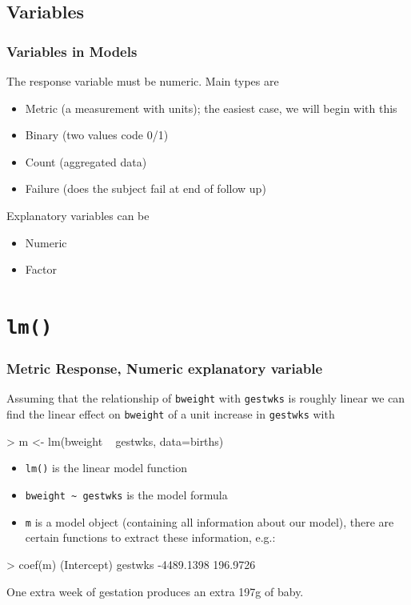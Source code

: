 \documentclass[xcolor={table}]{beamer}
\begin{document}
\subsection{Variables}
\begin{frame}\frametitle{Variables in Models}
The response variable must be numeric. Main types are
\begin{itemize}
\item Metric (a measurement with units); the easiest case, we will begin with this
\item Binary (two values code 0/1) 
\item Count (aggregated data)
\item Failure (does the subject fail at end of follow up)
\end{itemize}
Explanatory variables can be
\begin{itemize}
\item Numeric
\item Factor
\end{itemize}
\end{frame}




\section{\texttt{lm()}}
\begin{frame}[fragile]\frametitle{Metric Response, Numeric explanatory variable}
Assuming that the relationship of \texttt{bweight} with \texttt{gestwks} is roughly linear we can find the linear effect on \texttt{bweight} of a unit increase in \texttt{gestwks} with

\begin{semiverbatim}
> m <- lm(bweight ~ gestwks, data=births)
\end{semiverbatim}

\begin{itemize}
\item \texttt{lm()} is the linear model function
\item \verb|bweight ~ gestwks| is the model formula
\item \texttt{m} is a model object (containing all information about our model), there are certain functions to extract these information, e.g.:
\end{itemize}

\begin{semiverbatim}
> coef(m)
(Intercept)     gestwks 
 -4489.1398    196.9726 
\end{semiverbatim}

One extra week of gestation produces an extra 197g of baby.
\end{frame}
\end{document}
